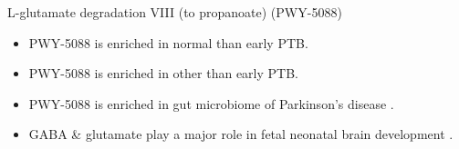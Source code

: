 \documentclass{beamer}
\begin{document}
\begin{frame}[allowframebreaks]
        \begin{block}{L-glutamate degradation VIII (to propanoate) (PWY-5088)}
            \begin{itemize}
                \item PWY-5088 is enriched in normal than early PTB.
                \item PWY-5088 is enriched in other than early PTB.
                \item PWY-5088 is enriched in gut microbiome of Parkinson's disease \cite{PWY-5088-1}.
                \item GABA \& glutamate play a major role in fetal neonatal brain development \cite{PWY-5088-2}.
            \end{itemize}
        \end{block}
    \end{frame}
\end{document}
